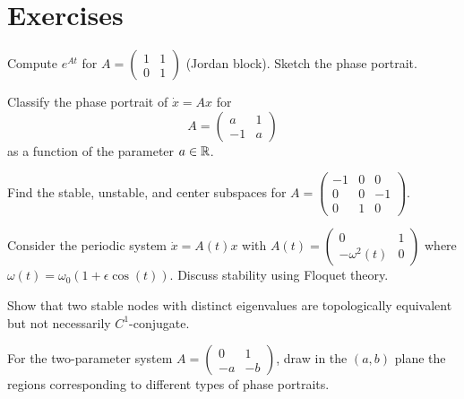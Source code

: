 \section{Exercises}

\begin{exercise}
Compute $e^{At}$ for $A = \begin{pmatrix} 1 & 1 \\ 0 & 1 \end{pmatrix}$
(Jordan block). Sketch the phase portrait.
\end{exercise}

\begin{exercise}[Classification]
Classify the phase portrait of $\dot{x} = Ax$ for
\[
    A = \begin{pmatrix} a & 1 \\ -1 & a \end{pmatrix}
\]
as a function of the parameter $a \in \mathbb{R}$.
\end{exercise}

\begin{exercise}[Dimension 3]
Find the stable, unstable, and center subspaces for
$A = \begin{pmatrix} -1 & 0 & 0 \\ 0 & 0 & -1 \\ 0 & 1 & 0 \end{pmatrix}$.
\end{exercise}

\begin{exercise}
Consider the periodic system $\dot{x} = A(t)x$ with
$A(t) = \begin{pmatrix} 0 & 1 \\ -\omega^2(t) & 0 \end{pmatrix}$
where $\omega(t) = \omega_0(1 + \epsilon\cos(t))$. Discuss stability using
Floquet theory.
\end{exercise}

\begin{exercise}
Show that two stable nodes with distinct eigenvalues are topologically
equivalent but not necessarily $C^1$-conjugate.
\end{exercise}

\begin{exercise}
For the two-parameter system
$A = \begin{pmatrix} 0 & 1 \\ -a & -b \end{pmatrix}$,
draw in the $(a, b)$ plane the regions corresponding to different types of
phase portraits.
\end{exercise}
